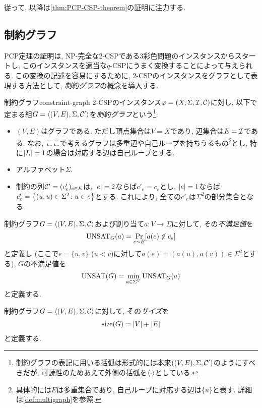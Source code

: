 従って, 以降は\cref{thm:PCP-CSP-theorem}の証明に注力する.

\subsection{制約グラフ}
PCP定理の証明は, NP-完全な2-CSPである3彩色問題のインスタンスからスタートし,
このインスタンスを適当な$q$-CSPにうまく変換することによって与えられる.
この変換の記述を容易にするために, 2-CSPのインスタンスをグラフとして表現する方法として, \emph{制約グラフ}の概念を導入する.

\begin{definition}{制約グラフ}{constraint-graph}
  2-CSPのインスタンス$\varphi=(X,\Sigma,\mathcal{I},\mathcal{C})$に対し, 以下で定まる組$G=\langle(V,E),\Sigma,\mathcal{C}'\rangle$を\emph{制約グラフ}という\footnote{制約グラフの表記に用いる括弧は形式的には本来$((V,E),\Sigma,\mathcal{C}')$のようにすべきだが, 可読性のためあえて外側の括弧を$\langle\cdot\rangle$としている.}:
  \begin{itemize}
    \item $(V,E)$はグラフである. ただし頂点集合は$V=X$であり, 辺集合は$E=\mathcal{I}$である. なお, ここで考えるグラフは多重辺や自己ループを持ちうるもの\footnote{具体的には$E$は多重集合であり, 自己ループに対応する辺は$\{u\}$と表す. 詳細は\cref{def:multigraph}を参照.}とし, 特に$\abs{I_i}=1$の場合は対応する辺は自己ループとする.
    \item アルファベット$\Sigma$.
    \item 制約の列$\mathcal{C}'=(c'_e)_{e\in E}$は, $\abs{e}=2$ならば$c'_e=c_e$とし, $\abs{e}=1$ならば$c'_e=\qty{ (u,u) \in \Sigma^2 \colon u\in e }$とする. これにより, 全ての$c'_e$は$\Sigma^2$の部分集合となる.
  \end{itemize}

  制約グラフ$G=\langle(V,E),\Sigma,\mathcal{C}\rangle$および割り当て$a\colon V\to \Sigma$に対して, その\emph{不満足値}を
  \begin{align*}
    \mathrm{UNSAT}_G(a) = \Pr_{e\sim E}[a(e) \not\in c_e]
  \end{align*}
  と定義し (ここで$e=\{u,v\}$ ($u<v$)に対して$a(e)=(a(u),a(v))\in\Sigma^2$とする), $G$の不満足値を
  \begin{align*}
    \mathrm{UNSAT}(G) = \min_{a\in\Sigma^V} \mathrm{UNSAT}_G(a)
  \end{align*}
  と定義する.

  制約グラフ$G=\langle(V,E),\Sigma,\mathcal{C}\rangle$に対して, その\emph{サイズ}を
  \begin{align*}
    \mathrm{size}(G) = \abs{V} + \abs{E}
  \end{align*}
  と定義する.
\end{definition}

